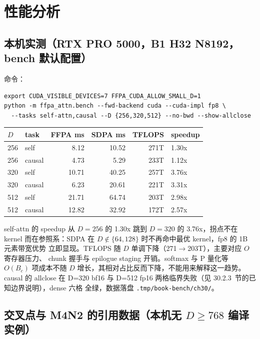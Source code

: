 \FloatBarrier

\section{性能分析}

\subsection{本机实测（RTX PRO 5000，B1 H32 N8192，bench 默认配置）}

命令：
\begin{lstlisting}[style=console,aboveskip=4pt,belowskip=2pt]
export CUDA_VISIBLE_DEVICES=7 FFPA_CUDA_ALLOW_SMALL_D=1
python -m ffpa_attn.bench --fwd-backend cuda --cuda-impl fp8 \
  --tasks self-attn,causal --D {256,320,512} --no-bwd --show-allclose
\end{lstlisting}

\begin{center}
\begin{tabular}{@{}llrrrl@{}}
\toprule
$D$ & task & FFPA ms & SDPA ms & TFLOPS & speedup \\
\midrule
256 & self   & 8.12  & 10.52 & 271T & 1.30x \\
256 & causal & 4.73  & 5.29  & 233T & 1.12x \\
320 & self   & 10.71 & 40.25 & 257T & 3.76x \\
320 & causal & 6.23  & 20.61 & 221T & 3.31x \\
512 & self   & 21.71 & 64.74 & 203T & 2.98x \\
512 & causal & 12.82 & 32.92 & 172T & 2.57x \\
\bottomrule
\end{tabular}
\end{center}

self-attn 的 speedup 从 $D=256$ 的 1.30x 跳到
$D=320$ 的 3.76x，拐点不在 kernel 而在参照系：SDPA 在
$D\notin\{64,128\}$ 时不再命中最优 kernel，fp8 的 1B 元素带宽优势
立即显现。TFLOPS 随 $D$ 单调下降（271$\to$203T），主要对应 $O$ 寄存器压力、
chunk 握手与 epilogue staging 开销。softmax 与 P 量化等 $O(B_c)$ 项成本不随
$D$ 增长，其相对占比反而下降，不能用来解释这一趋势。causal 的 allclose 在 D=320 bf16 与
D=512 fp16 两格临界失败（见 30.2.3~节的已知边界说明），dense 六格
全绿，数据落盘 \texttt{.tmp/book-bench/ch30/}。

\subsection{交叉点与 M4N2 的引用数据（本机无 $D\ge768$ 编译实例）}

